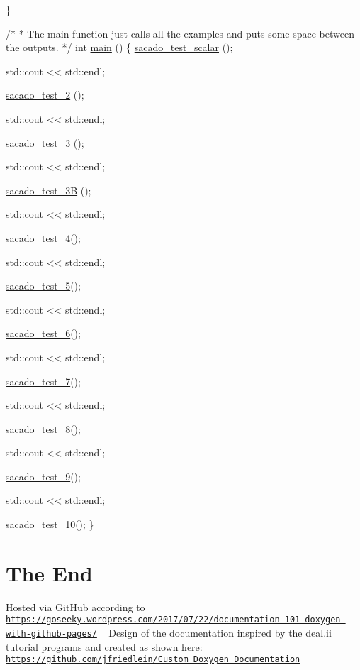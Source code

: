\begin{DoxyCode}
\}
 
 
\textcolor{comment}{/*}
\textcolor{comment}{ * The main function just calls all the examples and puts some space between the outputs.}
\textcolor{comment}{ */}
\textcolor{keywordtype}{int} \hyperlink{Sacado__example_8cc_ae66f6b31b5ad750f1fe042a706a4e3d4}{main} ()
\{
    \hyperlink{Sacado__example_8cc_a71b2675e62203edc430e7ffc8a365193}{sacado\_test\_scalar} ();
 
    std::cout << std::endl;
 
    \hyperlink{Sacado__example_8cc_a8ef4ff1e9526ca8451cdcd1678366d2c}{sacado\_test\_2} ();
 
    std::cout << std::endl;
 
    \hyperlink{Sacado__example_8cc_ae45e1df0eec246dbb6f2c3d28a2a58e4}{sacado\_test\_3} ();
 
    std::cout << std::endl;
 
    \hyperlink{Sacado__example_8cc_ae63cc8526935cb0512668e83cfc7b929}{sacado\_test\_3B} ();
 
    std::cout << std::endl;
 
    \hyperlink{Sacado__example_8cc_a2f4def4563e31d720e07bc7d6363ebe2}{sacado\_test\_4}();
 
    std::cout << std::endl;
 
    \hyperlink{Sacado__example_8cc_a327dbbb4ea7fc9840c46d149843a44c2}{sacado\_test\_5}();
 
    std::cout << std::endl;
 
    \hyperlink{Sacado__example_8cc_a27450ab52a9d4250e3f5a5f2a3f8f317}{sacado\_test\_6}();
 
    std::cout << std::endl;
 
    \hyperlink{Sacado__example_8cc_a0b694459e5e15c1578d97e637faba8de}{sacado\_test\_7}();
 
    std::cout << std::endl;
 
    \hyperlink{Sacado__example_8cc_aa7108ff8393b98d66dfef50899d048d9}{sacado\_test\_8}();
 
    std::cout << std::endl;
 
    \hyperlink{Sacado__example_8cc_ae176f83fe1943e102fe325d4a14f097e}{sacado\_test\_9}();
 
    std::cout << std::endl;
 
    \hyperlink{Sacado__example_8cc_a70dbdff0078e09883ba02d2724a432b2}{sacado\_test\_10}();
\}
\end{DoxyCode}
\hypertarget{index_END}{}\section{The End}\label{index_END}
Hosted via Git\+Hub according to \href{https://goseeky.wordpress.com/2017/07/22/documentation-101-doxygen-with-github-pages/}{\tt https\+://goseeky.\+wordpress.\+com/2017/07/22/documentation-\/101-\/doxygen-\/with-\/github-\/pages/} ~\newline
Design of the documentation inspired by the deal.\+ii tutorial programs and created as shown here\+: \href{https://github.com/jfriedlein/Custom_Doxygen_Documentation}{\tt https\+://github.\+com/jfriedlein/\+Custom\+\_\+\+Doxygen\+\_\+\+Documentation} 
